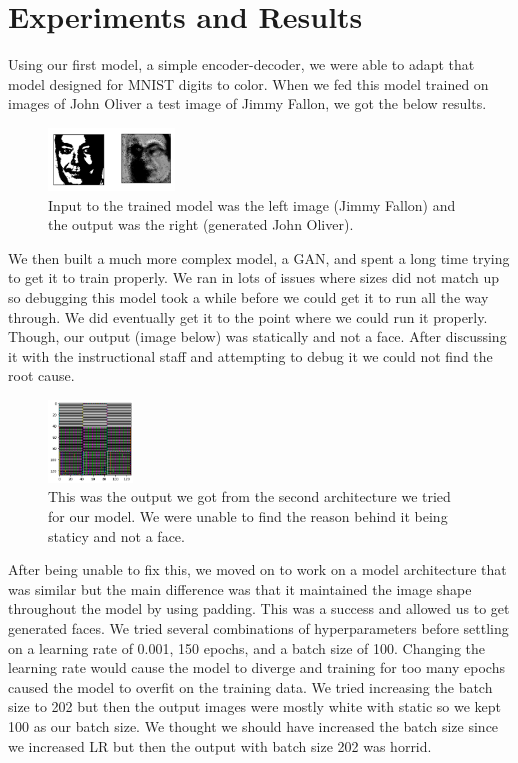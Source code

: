 \documentclass{article}
\begin{document}
\section{Experiments and Results}

Using our first model, a simple encoder-decoder, we were able to adapt that model designed for MNIST digits to color. When we fed this model trained on images of John Oliver a test image of Jimmy Fallon, we got the below results. 
 
\begin{figure}[!htbp]
\caption{Input to the trained model was the left image (Jimmy Fallon) and the output was the right (generated John Oliver).
}
\centering
\includegraphics[width=0.3\textwidth]{sidebyside.png}
\end{figure}

We then built a much more complex model, a GAN, and spent a long time trying to get it to train properly. We ran in lots of issues where sizes did not match up so debugging this model took a while before we could get it to run all the way through. We did eventually get it to the point where we could run it properly. Though, our output (image below) was statically and not a face. After discussing it with the instructional staff and attempting to debug it we could not find the root cause.

\begin{figure}[!htbp]
\caption{
This was the output we got from the second architecture we tried for our model. We were unable to find the reason behind it being staticy and not a face.}
\centering
\includegraphics[width=0.2\textwidth]{Greyyy.png}
\end{figure}

After being unable to fix this, we moved on to work on a model architecture that was similar but the main difference was that it maintained the image shape throughout the model by using padding. This was a success and allowed us to get generated faces. We tried several combinations of hyperparameters before settling on a learning rate of 0.001, 150 epochs, and a batch size of 100. Changing the learning rate would cause the model to diverge and training for too many epochs caused the model to overfit on the training data. We tried increasing the batch size to 202 but then the output images were mostly white with static so we kept 100 as our batch size. We thought we should have increased the batch size since we increased LR but then the output with batch size 202 was horrid.
\end{document}
